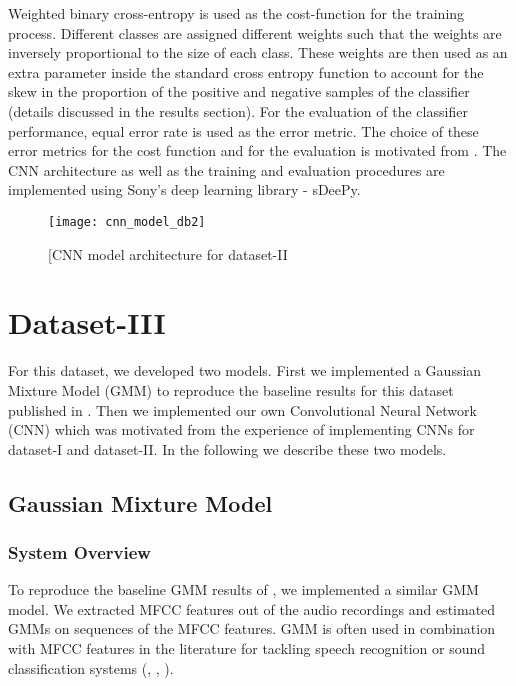 Weighted binary cross-entropy is used as the cost-function for the training process. Different classes are assigned different weights such that the weights are inversely proportional to the size of each class. These weights are then used as an extra parameter inside the standard cross entropy function to account for the skew in the proportion of the positive and negative samples of the classifier (details discussed in the results section). For the evaluation of the classifier performance, equal error rate is used as the error metric. The choice of these error metrics for the cost function and for the evaluation is motivated from \cite{kons2013audio}. The CNN architecture as well as the training and evaluation procedures are implemented using Sony's deep learning library - sDeePy.

\begin{figure}[!htb] 
\centering 
\texttt{[image: cnn\_model\_db2]}
\caption[CNN model architecture for dataset-II]{[CNN model architecture for dataset-II}
\label{fig:cnn_model_db2} 
\end{figure}


\section{Dataset-III}
For this dataset, we developed two models. First we implemented a Gaussian Mixture Model (GMM) to reproduce the baseline results for this dataset published in \cite{foster2015chime}. Then we implemented our own Convolutional Neural Network (CNN) which was motivated from the experience of implementing CNNs for dataset-I and dataset-II. In the following we describe these two models.

\subsection{Gaussian Mixture Model}

\subsubsection{System Overview}
To reproduce the baseline GMM results of \cite{foster2015chime}, we implemented a similar GMM model. We extracted MFCC features out of the audio recordings and estimated GMMs on sequences of the MFCC features. GMM is often used in combination with MFCC features in the literature for tackling speech recognition or sound classification systems (\cite{stowelldetection}, \cite{defreville2006automatic}, \cite{aucouturier2007bag}).

